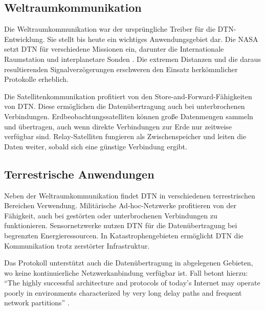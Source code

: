 \documentclass[paper=a4,fontsize=12pt,ngerman]{scrartcl}
\begin{document}
\subsection{Weltraumkommunikation}

Die Weltraumkommunikation war der ursprüngliche Treiber für die DTN-Entwicklung.
Sie stellt bis heute ein wichtiges Anwendungsgebiet dar. Die NASA setzt DTN für verschiedene Missionen ein, darunter die Internationale Raumstation und interplanetare Sonden \cite{NASA25}.
Die extremen Distanzen und die daraus resultierenden Signalverzögerungen erschweren den Einsatz herkömmlicher Protokolle erheblich.

Die Satellitenkommunikation profitiert von den Store-and-Forward-Fähigkeiten von DTN. Diese ermöglichen die Datenübertragung auch bei unterbrochenen Verbindungen.
Erdbeobachtungssatelliten können große Datenmengen sammeln und übertragen, auch wenn direkte Verbindungen zur Erde nur zeitweise verfügbar sind. Relay-Satelliten fungieren als Zwischenspeicher und leiten die Daten weiter, sobald sich eine günstige Verbindung ergibt.

\subsection{Terrestrische Anwendungen}

Neben der Weltraumkommunikation findet DTN in verschiedenen terrestrischen Bereichen Verwendung. Militärische Ad-hoc-Netzwerke profitieren von der Fähigkeit, auch bei gestörten oder unterbrochenen Verbindungen zu funktionieren.
Sensornetzwerke nutzen DTN für die Datenübertragung bei begrenzten Energieressourcen.
In Katastrophengebieten ermöglicht DTN die Kommunikation trotz zerstörter Infrastruktur.

Das Protokoll unterstützt auch die Datenübertragung in abgelegenen Gebieten, wo keine kontinuierliche Netzwerkanbindung verfügbar ist. 
Fall betont hierzu: \enquote{The highly successful architecture and protocols of today's Internet may operate poorly in environments characterized by very long delay paths and frequent network partitions} \cite [S. 1]{Fall03}.
\end{document}
